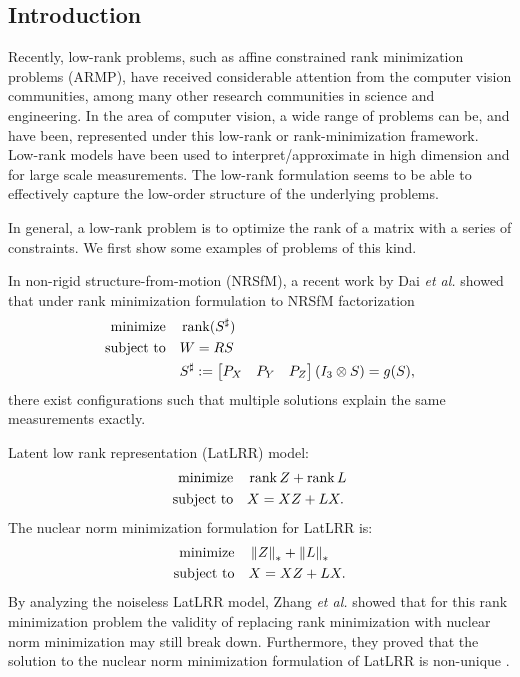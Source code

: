 \documentclass[11pt]{article}
\begin{document}
\subsection{Introduction}

Recently, low-rank problems, such as affine constrained rank minimization problems (ARMP), have received considerable attention from the computer vision communities, among many other research communities in science and engineering. In the area of computer vision, a wide range of problems can be, and have been, represented under this low-rank or rank-minimization framework. Low-rank models have been used to interpret/approximate in high dimension and for large scale measurements. The low-rank formulation seems to be able to effectively capture the low-order structure of the underlying problems.

In general, a low-rank problem is to optimize the rank of a matrix with a series of constraints. We first show some examples of problems of this kind.

\begin{example}
    In non-rigid structure-from-motion (NRSfM), a recent work by Dai \emph{et al.} \cite{dai2014simple} showed that under rank minimization formulation to NRSfM factorization
    \[\begin{aligned}
        \textnormal{minimize}\quad & \operatorname{rank}(S^{\sharp})\\
        \textnormal{subject to}\quad & W=RS\\
        & S^{\sharp}:=\begin{bmatrix}P_X & P_Y & P_Z\end{bmatrix}\left(I_3\otimes S\right)=g(S),
    \end{aligned}\]
    there exist configurations such that multiple solutions explain the same measurements exactly.
\end{example}

\begin{example}\label{eg:latlrr}
    Latent low rank representation (LatLRR) model:
    \[\begin{aligned}
        \textnormal{minimize}\quad & \operatorname{rank} Z+\operatorname{rank} L\\
        \textnormal{subject to}\quad & X=XZ+LX.
    \end{aligned}\]
    The nuclear norm minimization formulation for LatLRR is:
    \[\begin{aligned}
        \textnormal{minimize}\quad & \left\|Z\right\|_*+\left\|L\right\|_*\\
        \textnormal{subject to}\quad & X=XZ+LX.
    \end{aligned}\]
    By analyzing the noiseless LatLRR model, Zhang \emph{et al.} \cite{zhang2013counterexample} showed that for this rank minimization problem the validity of replacing rank minimization with nuclear norm minimization may still break down. Furthermore, they proved that the solution to the nuclear norm minimization formulation of LatLRR is non-unique \cite{dai2014rank}.
\end{example}
\end{document}
